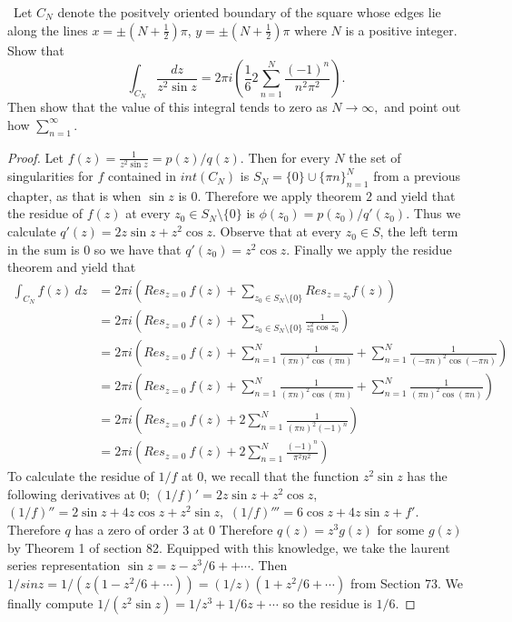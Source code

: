 \documentclass[11pt]{amsart}
\theoremstyle{definition}
\numberwithin{theorem}{section}
\numberwithin{definition}{section}
\numberwithin{equation}{section}
\newcommand{\parens}[1]{ \left( #1 \right) }
\begin{document}
\medskip {}\ Let $C_N$ denote the positvely oriented  boundary of the square whose edges lie 
along the lines $x = \pm\parens{N + \frac{1}{2}}\pi $, $y = \pm \parens{N+\frac{1}{2}}\pi$ where $N$ is a positive integer. Show that
\begin{equation*}
	\int_{C_N} \frac{dz}{z^2 \sin z} = 2\pi i\parens{\frac{1}{6} 2 \sum_{n=1}^N \frac{(-1)^n}{n^2\pi^2}}.
\end{equation*}
Then show that the value of this integral tends to zero as $N \to \infty,$ and point out how $\sum_{n=1}^\infty.$
\begin{proof}
	Let $f(z) = \frac{1}{z^2 \sin z} = p(z)/q(z).$ Then for every $N$ the set of singularities for $f$ contained in $int(C_N)$ is $S_N = \{0\} \cup \{\pi n\}_{n=1}^N$ from a previous chapter, as that is when $\sin z$ is $0$. Therefore we apply theorem $2$ and yield that the residue of $f(z)$ at every $z_0 \in S_N \setminus \{0\}$ is $\phi(z_0) = p(z_0)/q'(z_0).$ Thus we calculate $q'(z) = 2z \sin z + z^2 \cos z.$ Observe that at every $z_0 \in S$, the left term in the sum is $0$ so we have that $q'(z_0) = z^2 \cos z$. Finally we apply the residue theorem and yield that
	\begin{equation*}
	\begin{aligned}
		\int_{C_N} f(z)\ dz &= 2\pi i\parens{Res_{z= 0}\ f(z) + \sum_{z_0 \in S_N \setminus \{0\}} Res_{z= z_0} f(z) } \\
		 &= 2\pi i\parens{Res_{z= 0}\ f(z) + \sum_{z_0 \in S_N \setminus \{0\}} \frac{1}{z_0^2 \cos z_0}  }
		 \\&= 2\pi i\parens{Res_{z= 0}\ f(z) + \sum_{n=1}^N \frac{1}{(\pi n)^2 \cos (\pi n)} + \sum_{n=1}^N \frac{1}{(-\pi n)^2 \cos (- \pi n)}  }\\
		  &= 2\pi i\parens{Res_{z= 0}\ f(z) + \sum_{n=1}^N \frac{1}{(\pi n)^2 \cos (\pi n)} + \sum_{n=1}^N \frac{1}{(\pi n)^2 \cos( \pi n)}  }  \\&= 2\pi i\parens{Res_{z= 0}\ f(z) + 2\sum_{n=1}^N \frac{1}{(\pi n)^2 (-1)^n} } \\
		  &= 2\pi i\parens{Res_{z= 0}\ f(z) + 2\sum_{n=1}^N \frac{(-1)^n}{\pi^2 n^2 } }
	\end{aligned}
	\end{equation*}
	To calculate the residue of $1/f$ at $0$, we recall that the function $z^2 \sin z$ has the following derivatives at $0$; $(1/f)' = 2z \sin z + z^2 \cos z$, $(1/f)'' = 2 \sin z + 4z \cos z + z^2 \sin z,$ $(1/f)''' = 6 \cos z + 4z \sin z + f'$. Therefore $q$ has a zero of order 3 at $0$ Therefore $q(z) = z^3 g(z)$ for some $g(z)$ by Theorem 1 of section 82. Equipped with this knowledge, we take the laurent series representation $\sin z = z- z^3/6 + +  \cdots$.
	Then $1/sin z = 1/(z(1 - z^2/6+ \cdots)) = (1/z)(1 + z^2/6 + \cdots)$ from Section 73. We finally compute 
	$1/(z^2 \sin z) = 1/z^3 + 1/6z + \cdots$ so the residue is $1/6.$ 


\end{proof}
\end{document}

